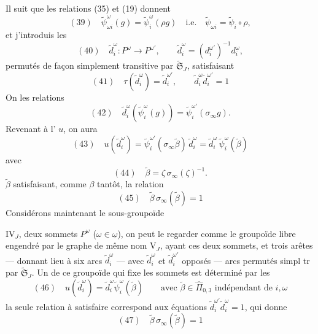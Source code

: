 \documentclass[11pt,a4paper]{article}
\begin{document}
Il suit que les relations (35) et (19) donnent
\[
(39)\quad \tilde\psi^{\omega}_{\omega i}(g) = \tilde\psi_i^{\omega}(\rho g) \quad \text{i.e.} \quad \tilde\psi_{\omega i} = \tilde\psi_i \circ \rho,
\]
et j'introduis les  
\[
(40)\quad \tilde d_i^{\omega} : P^{\omega} \to P^{\omega'}, \qquad \tilde d_i^{\omega} = (d_i^{\omega'})^{-1} d_i^{\omega},
\]
permutés de façon simplement transitive par $\widetilde{\mathfrak{S}}_J$,  satisfaisant
\[
(41)\quad \tau(\tilde d_i^{\omega}) = \tilde d_i^{\omega'}, \qquad \tilde d_i^{\omega} \tilde d_i^{\omega'} = 1
\]
On   les relations
\[
(42)\quad \tilde d_i^{\omega}(\tilde\psi_i^{\omega}(g)) = \tilde\psi_i^{\omega'}(\sigma_\infty g).
\]
Revenant à l'  $u$, on aura 
\[
(43)\quad u(\tilde d_i^{\omega}) = \tilde\psi_i^{\omega'}(\sigma_\infty \tilde\beta)\, \tilde d_i^{\omega} = \tilde d_i^{\omega}\, \tilde\psi_i^{\omega}(\tilde\beta)
\]
avec
\[
(44)\quad \tilde\beta = \zeta\, \sigma_\infty(\zeta)^{-1}.
\]
$\tilde\beta$ satisfaisant,  comme $\beta$ tantôt, la relation
\[
(45)\quad \tilde\beta\, \sigma_\infty(\tilde\beta) = 1
\]
Considérons maintenant le sous-groupoïde

$\mathrm{IV}_J$,   deux sommets $P^{\omega}$ \struck{\ill{}} ($\omega \in \underline{\omega}$), on peut le regarder comme le groupoïde libre engendré par le graphe de même nom $\mathrm{V}_J$, ayant ces deux sommets, et trois arêtes — donnant lieu à six arcs $\tilde d_i^{\omega}$ — avec $\tilde d_i^{\omega}$ et $\tilde d_i^{\omega'}$ opposés — arcs permutés   simpl tr \struck{\ill{}} par $\widetilde{\mathfrak{S}}_J$. Un  \struck{\ill{}} de ce groupoïde qui fixe les sommets est déterminé par les
\[
(46)\quad u(\tilde d_i^{\omega}) = \tilde d_i^{\omega} \tilde\psi_i^{\omega}(\tilde\beta)
\qquad \text{avec } \tilde\beta \in \widehat{\Pi}_{0,3} \text{ indépendant de } i, \omega
\]
la seule relation à satisfaire correspond aux équations $\tilde d_i^{\omega'} \tilde d_i^{\omega} = 1$, qui donne
\[
(47)\quad \tilde\beta\, \sigma_\infty(\tilde\beta) = 1
\]
\end{document}
